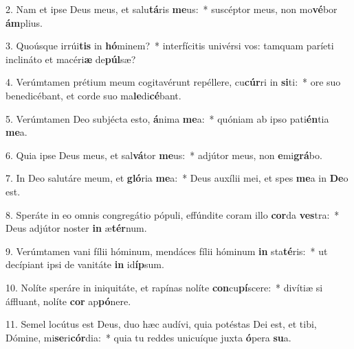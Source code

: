2. Nam et ipse Deus meus, et salu\textbf{tá}ris \textbf{me}us:~*  suscéptor meus, non mo\textbf{vé}bor \textbf{ám}plius.\

3. Quoúsque irrúi\textbf{tis} in \textbf{hó}minem?~*  interfícitis univérsi vos: tamquam paríeti inclináto et macéri\textbf{æ} de\textbf{púl}sæ?\

4. Verúmtamen prétium meum cogitavérunt repéllere, cu\textbf{cúr}ri in \textbf{si}ti:~*  ore suo benedicébant, et corde suo ma\textbf{le}di\textbf{cé}bant.\

5. Verúmtamen Deo subjécta esto, \textbf{á}nima \textbf{me}a:~*  quóniam ab ipso pati\textbf{én}tia \textbf{me}a.\

6. Quia ipse Deus meus, et sal\textbf{vá}tor \textbf{me}us:~*  adjútor meus, non \textbf{e}mi\textbf{grá}bo.\

7. In Deo salutáre meum, et \textbf{gló}ria \textbf{me}a:~*  Deus auxílii mei, et spes \textbf{me}a in \textbf{De}o est.\

8. Speráte in eo omnis congregátio pópuli, effúndite coram illo \textbf{cor}da \textbf{ves}tra:~*  Deus adjútor noster \textbf{in} æ\textbf{tér}num.\

9. Verúmtamen vani fílii hóminum, mendáces fílii hóminum \textbf{in} sta\textbf{té}ris:~*  ut decípiant ipsi de vanitáte \textbf{in} id\textbf{íp}sum.\

10. Nolíte speráre in iniquitáte, et rapínas nolíte \textbf{con}cu\textbf{pí}scere:~*  divítiæ si áffluant, nolíte \textbf{cor} ap\textbf{pó}nere.\

11. Semel locútus est Deus, duo hæc audívi, quia potéstas Dei est, et tibi, Dómine, mi\textbf{se}ri\textbf{cór}dia:~*  quia tu reddes unicuíque juxta \textbf{ó}pera \textbf{su}a.\

